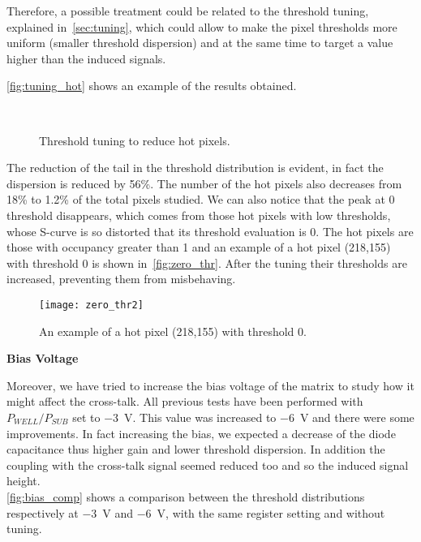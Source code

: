 Therefore, a possible treatment could be related to the threshold tuning, explained in~\autoref{sec:tuning}, which could allow to make the pixel thresholds more uniform (smaller threshold dispersion) and at the same time to target a value higher than the induced signals.

\autoref{fig:tuning_hot} shows an example of the results obtained.

\begin{figure}[h!]
\centering
{}\quad
{}\\
\caption{Threshold tuning to reduce hot pixels.}
\label{fig:tuning_hot}
\end{figure} 

The reduction of the tail in the threshold distribution is evident, in fact the dispersion is reduced by 56\%. The number of the hot pixels also decreases from 18\% to 1.2\% of the total pixels studied. We can also notice that the peak at 0 threshold disappears, which comes from those hot pixels with low thresholds, whose S-curve is so distorted that its threshold evaluation is 0. The hot pixels are those with occupancy greater than 1 and an example of a hot pixel (218,155) with threshold 0 is shown in~\autoref{fig:zero_thr}. After the tuning their thresholds are increased, preventing them from misbehaving.

\begin{figure}[h!]
\centering
\texttt{[image: zero\_thr2]}
\caption{An example of a hot pixel (218,155) with threshold 0.}
\label{fig:zero_thr}
\end{figure} 



\begin{description}
\item \textbf{Bias Voltage}
\end{description}

Moreover, we have tried to increase the bias voltage of the  matrix to study how it might affect the cross-talk. All previous tests have been performed with $P_{WELL}/P_{SUB}$ set to \SI{-3}{V}. This value was increased to \SI{-6}{V} and there were some improvements. In fact increasing the bias, we expected a decrease of the diode capacitance thus higher gain and lower threshold dispersion. In addition the coupling with the cross-talk signal seemed reduced too and so the induced signal height. \\
\autoref{fig:bias_comp} shows a comparison between the threshold distributions respectively at \SI{-3}{V} and \SI{-6}{V}, with the same register setting and without tuning.

